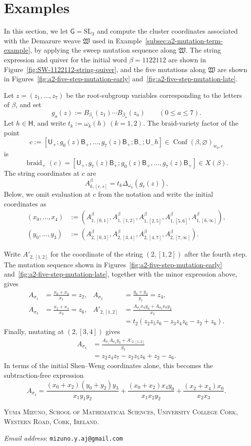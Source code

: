 \documentclass[10pt,a4paper]{article}
\theoremstyle{definition}
\theoremstyle{remark}
\newcommand{\groupG}{\mathsf{G}}
\newcommand{\borelB}{\mathsf{B}}
\newcommand{\unipotentU}{\mathsf{U}}
\newcommand{\torusH}{\mathsf{H}}
\newcommand{\Conf}{\operatorname{Conf}}
\newcommand{\fW}{\mathfrak W}
\begin{document}
\section{Examples}

In this section, we let \(\groupG=\mathrm{SL}_3\) and compute the cluster
coordinates associated with the Demazure weave \(\fW\) used in
Example~\ref{subsec:a2-mutation-term-example}, by applying the sweep mutation
sequence along \(\fW\).
The string expression and
quiver for the initial word \(\beta=1122112\) are shown in
Figure~\ref{fig:SW-1122112-string-quiver}, and the five mutations along \(\fW\)
are shown in Figures~\ref{fig:a2-five-step-mutation-early}
and~\ref{fig:a2-five-step-mutation-late}.

Let \(z=(z_1,\ldots,z_7)\) be the root-subgroup variables corresponding to
the letters of \(\beta\), and set
\[
 g_a(z):=B_{\beta_1}(z_1)\cdots B_{\beta_a}(z_a)
 \qquad(0\le a\le7).
\]
Let \(h\in\torusH\), and write \(t_k:=\omega_k(h)\ (k=1,2)\).  The
braid-variety factor of the point
\[
 c
 :=[\unipotentU_+;
     g_0(z)\borelB_+,\ldots,g_7(z)\borelB_+;
     \borelB_-;\unipotentU_-h]
 \in\Conf(\beta,\varnothing)_{w_0,e}
\]
is
\[
 \operatorname{braid}_+(c)
 =[\unipotentU_+,g_7(z)\borelB_+;
   g_0(z)\borelB_+,\ldots,g_7(z)\borelB_+]
 \in X(\beta).
\]
The string coordinates at \(c\) are
\[
 A_{k,[r,s]}^\beta=t_k\Delta_{\omega_k}(g_r(z)).
\]
Below, we omit evaluation at \(c\) from the notation and write the initial
coordinates as
\begin{align*}
 (x_0,\ldots,x_4)
 &:=(A_{1,[0,1]}^\beta,A_{1,[1,2]}^\beta,
     A_{1,[2,5]}^\beta,A_{1,[5,6]}^\beta,
     A_{1,[6,\infty]}^\beta),\\
 (y_0,\ldots,y_3)
 &:=(A_{2,[0,3]}^\beta,A_{2,[3,4]}^\beta,
     A_{2,[4,7]}^\beta,A_{2,[7,\infty]}^\beta).
\end{align*}

Write \(A'_{2,[1,2]}\) for the coordinate of the string \((2,[1,2])\) after
the fourth step.  The mutation sequence shown in
Figures~\ref{fig:a2-five-step-mutation-early}
and~\ref{fig:a2-five-step-mutation-late}, together with the minor expression
above, gives
\begin{align*}
 A_{\sigma_1}
 &=\frac{x_0+x_2}{x_1}=z_2,
 &
 A_{\sigma_2}
 &=\frac{y_0+y_2}{y_1}=z_4,\\
 A_{\sigma_3}
 &=\frac{x_2+x_4}{x_3}=z_6,
 &
 A'_{2,[1,2]}
 &=\frac{A_{\sigma_1}x_4y_0+A_{\sigma_3}x_0y_2}{x_2}\\
 &&&=t_2(z_2z_5z_6-z_3z_4z_6-z_2+z_6).
\end{align*}
Finally, mutating at \((2,[3,4])\) gives
\begin{align*}
 A_{\sigma_4}
 &=\frac{A_{\sigma_1}A_{\sigma_2}y_3
          +A'_{2,[1,2]}}{y_2}\\
 &=z_2z_4z_7-z_2z_5z_6+z_2-z_6.
\end{align*}
In terms of the initial Shen--Weng coordinates alone, this becomes the
subtraction-free expression
\[
 A_{\sigma_4}
 =\frac{(x_0+x_2)(y_0+y_2)y_3}{x_1y_1y_2}
  +\frac{(x_0+x_2)x_4y_0}{x_1x_2y_2}
  +\frac{(x_2+x_4)x_0}{x_2x_3}.
\]

\printbibliography

\bigskip

\noindent
\textsc{Yuma Mizuno, School of Mathematical Sciences, University College Cork, Western Road,
Cork, Ireland.}\par
\noindent
\textit{Email address}: \texttt{mizuno.y.aj@gmail.com}
\end{document}
